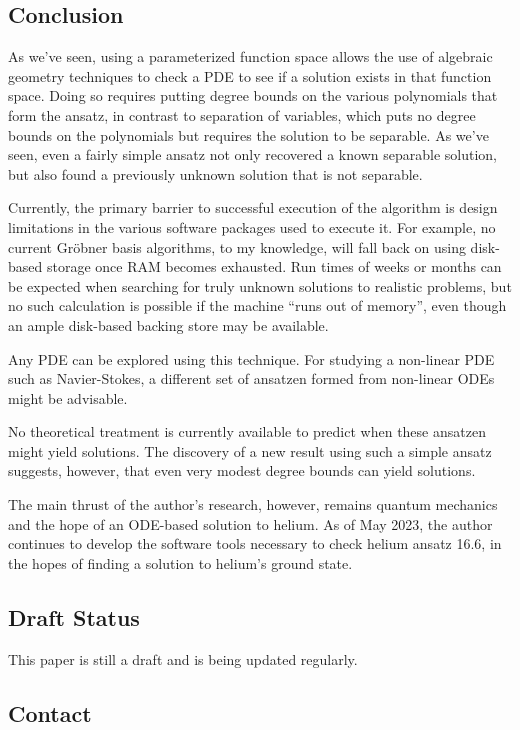 \documentclass{article}
\begin{document}
\subsection*{Conclusion}

As we've seen, using a parameterized function space allows the use of algebraic geometry
techniques to check a PDE to see if a solution exists in that function space.
Doing so requires putting degree bounds on the various polynomials that form
the ansatz, in contrast to separation of variables, which puts no degree bounds
on the polynomials but requires the solution to be separable.  As we've seen,
even a fairly simple ansatz not only recovered a known separable solution,
but also found a previously unknown solution that is not separable.

Currently, the primary barrier to successful execution of the algorithm is
design limitations in the various software packages used to execute it.
For example, no current Gr\"obner basis algorithms, to my knowledge,
will fall back on using disk-based storage once RAM becomes exhausted.
Run times of weeks or months can be expected when searching for
truly unknown solutions to realistic problems, but no such
calculation is possible if the machine ``runs out of memory'',
even though an ample disk-based backing store may be available.

Any PDE can be explored using this technique.  For studying a
non-linear PDE such as Navier-Stokes, a different set of
ansatzen formed from non-linear ODEs might be advisable.

No theoretical treatment is currently available to predict
when these ansatzen might yield solutions.  The discovery
of a new result using such a simple ansatz suggests, however,
that even very modest degree bounds can yield solutions.

The main thrust of the author's research, however, remains
quantum mechanics and the hope of an ODE-based solution
to helium.  As of May 2023, the author continues to develop
the software tools necessary to check helium ansatz 16.6,
in the hopes of finding a solution to helium's ground state.

\subsection*{Draft Status}

This paper is still a draft and is being updated regularly.

\subsection*{Contact}
\end{document}
